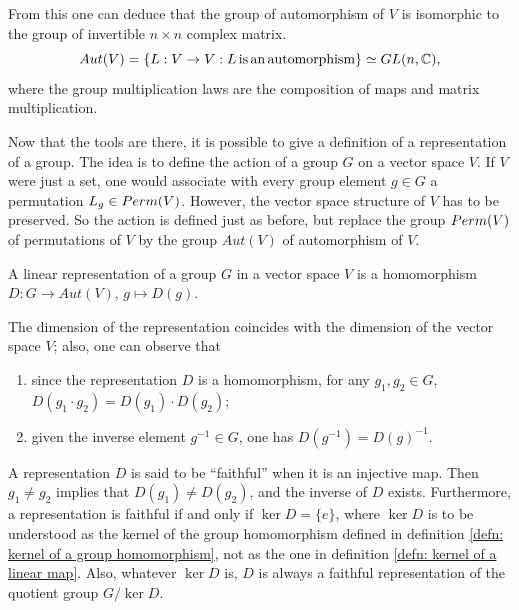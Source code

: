 From this one can deduce that the group of automorphism of $V$ is isomorphic to the group of invertible $n \times n$ complex matrix.
\begin{equation}
    Aut(V) = \{L : V \to V : L\mathrm{\,is\,an\,automorphism}\} \simeq GL(n,\mathbb{C}),
\end{equation}
where the group multiplication laws are the composition of maps and matrix multiplication. 

Now that the tools are there, it is possible to give a definition of a representation of a group. The idea is to define the action of a group $G$ on a vector space $V$. If $V$ were just a set, one would associate with every group element $g \in G$ a permutation $L_g \in {Perm}(V)$. However, the vector space structure of $V$ has to be preserved. So the action is defined just as before, but replace the group ${Perm}(V)$ of permutations of $V$ by the group $Aut(V)$ of automorphism of $V$. 
\begin{defn}
    A linear representation of a group $G$ in a vector space $V$ is a homomorphism $D : G \to Aut(V)$, $g\mapsto D(g)$.
\end{defn}
The dimension of the representation coincides with the dimension of the vector space $V$; also, one can observe that
\begin{enumerate}
    \item since the representation $D$ is a homomorphism,  for any $g_1,g_2 \in G$, $D(g_1\cdot g_2) = D(g_1)\cdot D(g_2)$;
    \item given the inverse element $g^{-1} \in G$, one has $D(g^{-1}) = D(g)^{-1}$.
\end{enumerate}
A representation $D$ is said to be ``faithful'' when it is an injective map. Then $g_1 \neq g_2$ implies that $D(g_1) \neq D(g_2)$, and the inverse of $D$ exists. Furthermore, a representation is faithful if and only if $\ker{D} = \{e\}$, where $\ker{D}$ is to be understood as the kernel of the group homomorphism defined in definition \ref{defn: kernel of a group homomorphism}, not as the one in definition \ref{defn: kernel of a linear map}. Also, whatever $\ker{D}$ is, $D$ is always a faithful representation of the quotient group $G/\ker{D}$. 

